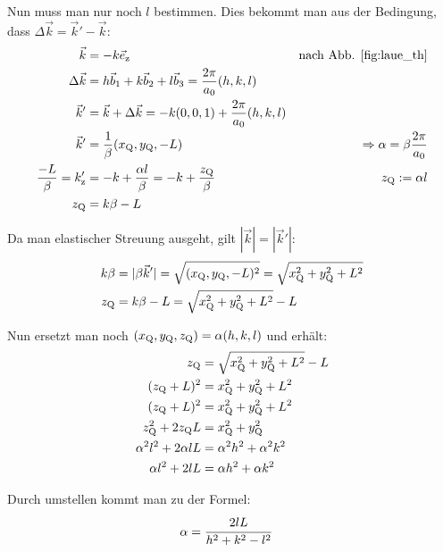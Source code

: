 Nun muss man nur noch $l$ bestimmen. Dies bekommt man aus der Bedingung, dass $\Delta\vec{k} = \vec{k}' -\vec{k}$:
\begin{align*}
\vec{k} &= -k\vec{e}_\mathrm{z} & \text{nach Abb. \ref{fig:laue_th}}\\
\Delta\vec{k} &= h\vec{b}_1 + k\vec{b}_2 + l\vec{b}_3 = \frac{2\pi}{a_0} (h, k, l)\\
\vec{k}' &= \vec{k} + \Delta\vec{k} = -k (0,0,1) + \frac{2\pi}{a_0} (h,k,l)\\
\vec{k}' &= \frac{1}{\beta} (x_\mathrm{Q},y_\mathrm{Q},-L) &\Rightarrow \alpha = \beta \frac{2\pi}{a_0}\\
\frac{-L}{\beta} = k_\mathrm{z}' &= -k +\frac{\alpha l}{\beta} = -k + \frac{z_\mathrm{Q}}{\beta} & z_\mathrm{Q} := \alpha l\\
z_\mathrm{Q} &= k\beta - L\\
\end{align*}

Da man elastischer Streuung ausgeht, gilt $|\vec{k}| = |\vec{k}'|$: 
\begin{align*}
k\beta &= |\beta\vec{k}'| = \sqrt{(x_\mathrm{Q}, y_\mathrm{Q},-L)^2} = \sqrt{x_\mathrm{Q}^2 + y_\mathrm{Q}^2 + L^2}\\
z_\mathrm{Q} &= k\beta - L = \sqrt{x_\mathrm{Q}^2 + y_\mathrm{Q}^2 + L^2} - L
\end{align*}

Nun ersetzt man noch $(x_\mathrm{Q}, y_\mathrm{Q}, z_\mathrm{Q}) = \alpha (h,k,l)$ und erhält:
\begin{align*}
z_\mathrm{Q} &= \sqrt{x_\mathrm{Q}^2 + y_\mathrm{Q}^2 + L^2} - L\\
(z_\mathrm{Q}+L)^2 &= x_\mathrm{Q}^2 + y_\mathrm{Q}^2 + L^2\\
(z_\mathrm{Q}+L)^2 &= x_\mathrm{Q}^2 + y_\mathrm{Q}^2 + L^2\\
z_\mathrm{Q}^2+2z_\mathrm{Q}L &= x_\mathrm{Q}^2 + y_\mathrm{Q}^2\\
\alpha^2 l^2+2\alpha l L &= \alpha^2 h^2 + \alpha^2 k^2\\
\alpha l^2+2 l L &= \alpha h^2 + \alpha k^2
\end{align*}  

Durch umstellen kommt man zu der Formel:
\begin{align}
\alpha &= \cfrac{2lL}{h^2 + k^2 - l^2}
\label{eq:alpha}
\end{align} 